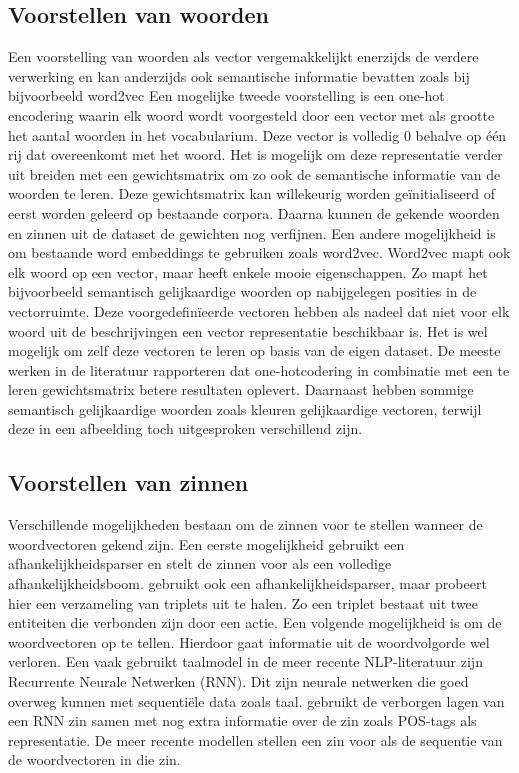 \subsection{Voorstellen van woorden}
 Een voorstelling van woorden als vector vergemakkelijkt enerzijds de verdere verwerking en kan anderzijds ook semantische informatie bevatten zoals bij bijvoorbeeld word2vec\cite{Mikolov2013} 
 Een mogelijke tweede voorstelling is een one-hot encodering waarin elk woord wordt voorgesteld door een vector met als grootte het aantal woorden in het vocabularium. Deze vector is volledig 0 behalve op \'e\'en rij dat overeenkomt met het woord. Het is mogelijk om deze representatie verder uit breiden met een gewichtsmatrix om zo ook de semantische informatie van de woorden te leren. Deze gewichtsmatrix kan willekeurig worden ge\"initialiseerd of eerst worden geleerd op bestaande corpora.\cite{Lebret2013}\cite{Google}\cite{Mao} Daarna kunnen de gekende woorden en zinnen uit de dataset de gewichten nog verfijnen.  Een andere mogelijkheid is om bestaande word embeddings te gebruiken zoals word2vec. Word2vec mapt ook elk woord op een vector, maar heeft enkele mooie eigenschappen. Zo mapt het bijvoorbeeld semantisch gelijkaardige woorden op nabijgelegen posities in de vectorruimte.\cite{mikolov} Deze voorgedefin\"ieerde vectoren hebben als nadeel dat niet voor elk woord uit de beschrijvingen een vector representatie beschikbaar is. Het is wel mogelijk om zelf deze vectoren te leren op basis van de eigen dataset.
 De meeste werken in de literatuur rapporteren dat one-hotcodering in combinatie met een te leren gewichtsmatrix betere resultaten oplevert. Daarnaast hebben sommige semantisch gelijkaardige woorden zoals kleuren gelijkaardige vectoren, terwijl deze in een afbeelding toch uitgesproken verschillend zijn. 
 
 \subsection{Voorstellen van zinnen}
 Verschillende mogelijkheden bestaan om de zinnen voor te stellen wanneer de woordvectoren gekend zijn. Een eerste mogelijkheid gebruikt een afhankelijkheidsparser en stelt de zinnen voor als een volledige afhankelijkheidsboom.\cite{Socher} \cite{Karpathy} gebruikt ook een afhankelijkheidsparser, maar probeert hier een verzameling van triplets uit te halen. Zo een triplet bestaat uit twee entiteiten die verbonden zijn door een actie. Een volgende mogelijkheid is om de woordvectoren op te tellen.\cite{Lebret} Hierdoor gaat informatie uit de woordvolgorde wel verloren. Een vaak gebruikt taalmodel in de meer recente NLP-literatuur zijn Recurrente Neurale Netwerken (RNN).\cite{Mikolov2010} Dit zijn neurale netwerken die goed overweg kunnen met sequenti\"ele data zoals taal.\cite{Kiros} gebruikt  de verborgen lagen van een RNN zin samen met nog extra informatie over de zin zoals POS-tags als representatie. De meer recente modellen stellen een zin voor als de sequentie van de woordvectoren in die zin.
 
